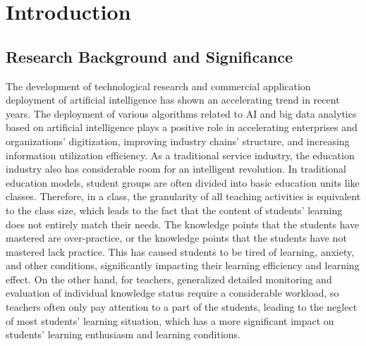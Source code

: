 
\chapter{Introduction}  %

\ifpdf
    \graphicspath{{Chapter1/Figs/Raster/}{Chapter1/Figs/PDF/}{Chapter1/Figs/}}
\else
    \graphicspath{{Chapter1/Figs/Vector/}{Chapter1/Figs/}}
\fi


\section{Research Background and Significance} %

The development of technological research and commercial application deployment of artificial intelligence has shown an accelerating trend in recent years. The deployment of various algorithms related to AI and big data analytics based on artificial intelligence plays a positive role in accelerating enterprises and organizations' digitization, improving industry chains' structure, and increasing information utilization efficiency. As a traditional service industry, the education industry also has considerable room for an intelligent revolution. In traditional education models, student groups are often divided into basic education units like classes. Therefore, in a class, the granularity of all teaching activities is equivalent to the class size, which leads to the fact that the content of students' learning does not entirely match their needs. The knowledge points that the students have mastered are over-practice, or the knowledge points that the students have not mastered lack practice. This has caused students to be tired of learning, anxiety, and other conditions, significantly impacting their learning efficiency and learning effect. On the other hand, for teachers, generalized detailed monitoring and evaluation of individual knowledge status require a considerable workload, so teachers often only pay attention to a part of the students, leading to the neglect of most students' learning situation, which has a more significant impact on students' learning enthusiasm and learning conditions.

